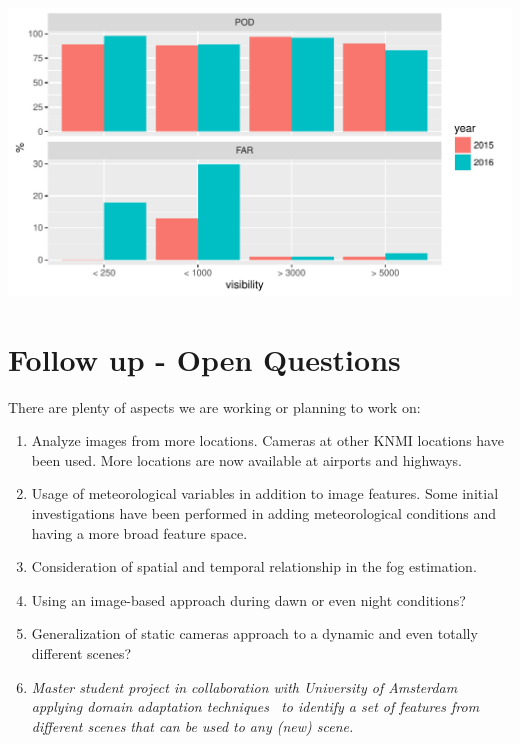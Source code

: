 \documentclass{article}
\begin{document}
\begin{minipage}[b]{\columnwidth}
	\begin{center}
	\includegraphics[width=0.9\columnwidth]{PODandFAR3-1}
	\label{PODFAR}
	\end{center}
\end{minipage}







\section*{Follow up - Open Questions}
There are plenty of aspects we are working or planning to work on:
\begin{enumerate}
\item Analyze images from more locations. \newline
Cameras at other KNMI locations have been used. More locations are now available at airports and highways.
\item Usage of meteorological variables in addition to image features.\newline
Some initial investigations have been performed in adding meteorological conditions and having a more broad feature space.
\item Consideration of spatial and temporal relationship in the fog estimation.
\item Using an image-based approach during dawn or even night conditions? 
\item Generalization of static cameras approach to a dynamic and even totally different scenes? 
\item \emph{Master student project in collaboration with University of Amsterdam applying domain adaptation techniques~\cite{ganin2016domain} to identify a set of features from different scenes that can be used to any (new) scene.}
\end{enumerate}
\end{document}
